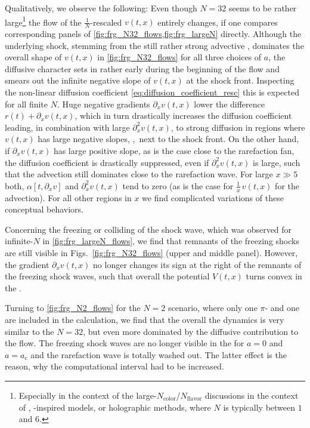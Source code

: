 Qualitatively, we observe the following: Even though $N = 32$ seems to be rather large\footnote{%
Especially in the context of the large-$N_\mathrm{color}$/$N_\mathrm{flavor}$ discussions in the context of \qcd{}, \qcd{}-inspired models, or holographic methods, where $N$ is typically between $1$ and $6$.%
} the \frg{} flow of the $\tfrac{1}{N}$-rescaled $v ( t, x )$ entirely changes, if one compares corresponding panels of \cref{fig:frg_N32_flows,fig:frg_largeN} directly.
Although the underlying shock, stemming from the still rather strong advective \pionModes{}, dominates the overall shape of $v ( t, x )$ in \cref{fig:frg_N32_flows} for all three choices of $a$, the diffusive character sets in rather early during the beginning of the \frg{} flow and smears out the infinite negative slope of $v ( t, x )$ at the shock front.
Inspecting the non-linear diffusion coefficient \eqref{eq:diffusion_coefficient_resc} this is expected for all finite $N$.
Huge negative gradients $\partial_x v ( t, x )$ lower the difference $r ( t ) + \partial_x v ( t, x )$, which in turn drastically increases the diffusion coefficient leading, in combination with large $\partial_x^2 v ( t, x )$, to strong diffusion in regions where $v ( t, x )$ has large negative slopes, \eg{},\ next to the shock front.
On the other hand, if $\partial_x v ( t, x )$ has large positive slope, as is the case close to the rarefaction fan, the diffusion coefficient is drastically suppressed, even if $\partial_x^2 v ( t, x )$ is large, such that the advection still dominates close to the rarefaction wave.
For large $x \gg 5$ both, $\alpha [ t, \partial_x v ]$ and $\partial_x^2 v ( t, x )$ tend to zero (as is the case for $\tfrac{1}{x} \, v ( t, x )$ for the advection).
For all other regions in $x$ we find complicated variations of these conceptual behaviors.
	
Concerning the freezing or colliding of the shock wave, which was observed for infinite-$N$ in \cref{fig:frg_largeN_flows}, we find that remnants of the freezing shocks are still visible in Figs.~\ref{fig:frg_N32_flows} (upper and middle panel).
However, the gradient $\partial_x v ( t, x )$ no longer changes its sign at the right of the remnants of the freezing shock waves, such that overall the potential $V ( t, x )$ turns convex in the \ir{}.\bigskip
	
Turning to \cref{fig:frg_N2_flows} for the $N = 2$ scenario, where only one $\pi$- and one \sigmaMode{} are included in the calculation, we find that the overall the dynamics is very similar to the $N = 32$, but even more dominated by the diffusive contribution to the \frg{} flow.
The freezing shock waves are no longer visible in the \ir{} for $a = 0$ and $a = a_\mathrm{c}$ and the rarefaction wave is totally washed out.
The latter effect is the reason, why the computational interval had to be increased.
	
